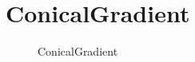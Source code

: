 ﻿




\FloatBarrier
\section{
ConicalGradient
}\label{c000015s000010}


\begin{figure}[htb] %
\marginnote{\setlength\fboxsep{2pt}\fbox{\footnotesize{\kaishu\figurename\,}\footnotesize{\ref{p000026}}}}\centering %
\setlength\fboxsep{0pt} %
\caption{ConicalGradient} %
\label{p000026} %
\end{figure}


